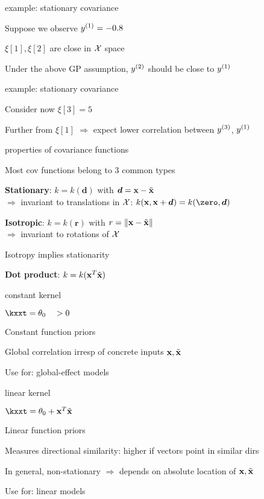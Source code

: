 \documentclass[11pt,compress,t,notes=noshow, xcolor=table]{beamer}
\begin{document}
\begin{framei}{example: stationary covariance}
\item Suppose we observe $\yi[1] = -0.8$
\item $\xi[1], \xi[2]$ are close in $\Xspace$ space
\item Under the above GP assumption, $\yi[2]$ should be close to $\yi[1]$ 
\vfill
{}
\end{framei}

\begin{framei}{example: stationary covariance}
\item Consider now $\xi[3] = 5$
\item Further from $\xi[1]$ $\Rightarrow$ expect lower correlation between $\yi[3]$, $\yi[1]$ 
\vfill
{}
\end{framei}

\begin{framei}[sep=L]{properties of covariance functions}
\item Most cov functions belong to 3 common types
\item \textbf{Stationary}: $k = k(\bm{d})$ with $\bm{d} = \xv - \xtil$ \\
$\Rightarrow$ invariant to translations in $\Xspace$: $k(\xv, \xv + \bm{d}) = k(\zero, \bm{d})$
\item \textbf{Isotropic}: $k = k(\bm{r})$ with $r = \xxtnorm$ \\
$\Rightarrow$ invariant to rotations of $\Xspace$
\item Isotropy implies stationarity
\item \textbf{Dot product}: $k = k(\xv^T \xtil)$
\end{framei}

\begin{framei}{constant kernel}
\item $\kxxt = \theta_0 \quad > 0$
\item Constant function priors
\item Global correlation irresp of concrete inputs $\xv, \xtil$
\item Use for: global-effect models
\vfill
{}
\end{framei}

\begin{framei}{linear kernel}
\item $\kxxt = \theta_0 + \xv^T \xtil$
\item Linear function priors
\item Measures directional similarity: higher if vectors point in similar dirs
\item In general, non-stationary $\Rightarrow$ depends on absolute location of $\xv, \xtil$
\item Use for: linear models
\vfill
{}
\end{framei}
\end{document}
